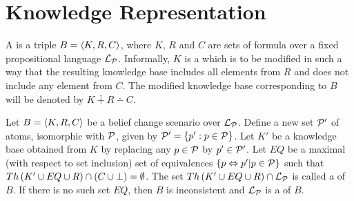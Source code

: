 
\section{Knowledge Representation}

\begin{defi}
A  is a triple $B=\left\langle K,R,C\right\rangle$, where $K$, $R$ and $C$ are sets of formula over a fixed propositional language $\mathcal{L}_{\mathcal{P}}$. Informally, $K$ is a  which is to be modified in such a way that the resulting knowledge base includes all elements from $R$ and does not include any element from $C$. The modified knowledge base corresponding to $B$ will be denoted by $K\dotplus R\dotminus C$.
\cite{conf/fedcsis/KorpusikLM12}
\end{defi}

\begin{defi}
Let $B=\left\langle K,R,C\right\rangle$ be a belief change scenario over $\mathcal{L}_{\mathcal{P}}$. Define a new set $\mathcal{P}'$ of atoms, isomorphic with $\mathcal{P}$, given by $\mathcal{P}'=\left\{ p':p\in\mathcal{P}\right\}$. Let $K'$ be a knowledge base obtained from $K$ by replacing any $p\in\mathcal{P}$ by $p'\in\mathcal{P}'$. Let $EQ$ be a maximal (with respect to set inclusion) set of equivalences $\left\{ p\Leftrightarrow p'|p\in\mathcal{P}\right\}$ such that $Th\left(K'\cup EQ\cup R\right)\cap\left( C\cup\bot\right)=\emptyset$. The set $Th\left(K'\cup EQ\cup R\right)\cap\mathcal{L}_{\mathcal{P}}$ is called a  of $B$. If there is no such set $EQ$, then $B$ is inconsistent and $\mathcal{L}_{\mathcal{P}}$ is a  of $B$.
\cite{conf/fedcsis/KorpusikLM12}
\end{defi}

